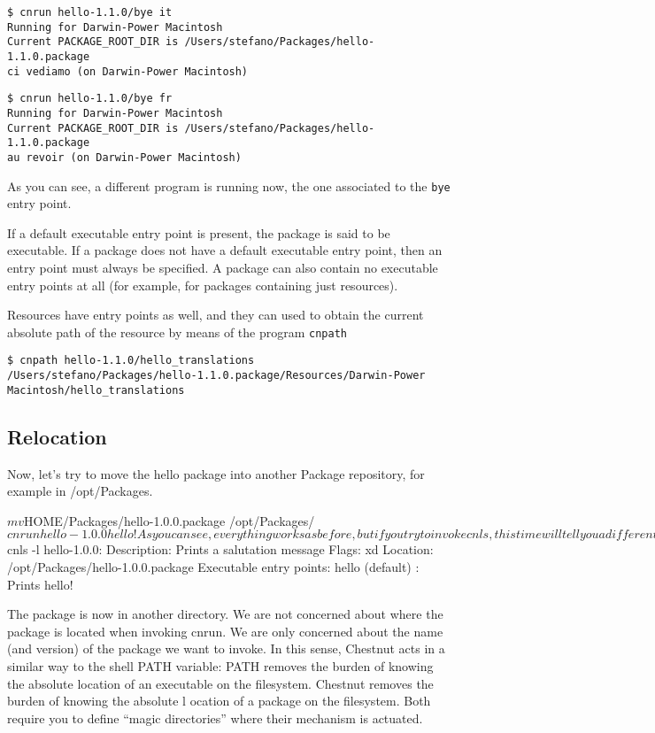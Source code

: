\begin{verbatim}
$ cnrun hello-1.1.0/bye it
Running for Darwin-Power Macintosh
Current PACKAGE_ROOT_DIR is /Users/stefano/Packages/hello-1.1.0.package
ci vediamo (on Darwin-Power Macintosh)
\end{verbatim}

\begin{verbatim}
$ cnrun hello-1.1.0/bye fr
Running for Darwin-Power Macintosh
Current PACKAGE_ROOT_DIR is /Users/stefano/Packages/hello-1.1.0.package
au revoir (on Darwin-Power Macintosh)
\end{verbatim}

As you can see, a different program is running now, the one associated to the \verb+bye+ entry point.

If a default executable entry point is present, the package is said to be
executable. If a package does not have a default executable entry point, then
an entry point must always be specified. A package can also contain
no executable entry points at all (for example, for packages containing just resources).

Resources have entry points as well, and they can used to obtain the current
absolute path of the resource by means of the program \verb+cnpath+

\begin{verbatim}
$ cnpath hello-1.1.0/hello_translations
/Users/stefano/Packages/hello-1.1.0.package/Resources/Darwin-Power Macintosh/hello_translations
\end{verbatim}

\subsection{Relocation}

Now, let’s try to move the hello package into another Package repository, for example in /opt/Packages.

$ mv $HOME/Packages/hello-1.0.0.package /opt/Packages/
$ cnrun hello-1.0.0
hello!

As you can see, everything works as before, but if you try to invoke cnls, this
time will tell you a different story about the location of the package

$ cnls -l
hello-1.0.0:
    Description: Prints a salutation message
    Flags: xd
    Location: /opt/Packages/hello-1.0.0.package
    Executable entry points:
        hello (default) : Prints hello!

The package is now in another directory. We are not concerned about where the
package is located when invoking cnrun. We are only concerned about the name
(and version) of the package we want to invoke. In this sense, Chestnut acts in
a similar way to the shell PATH variable: PATH removes the burden of knowing
the absolute location of an executable on the filesystem. Chestnut removes the
burden of knowing the absolute l ocation of a package on the filesystem. Both
require you to define “magic directories” where their mechanism is actuated.


